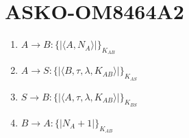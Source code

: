 \section{ASKO-OM8464A2}

\begin{enumerate}
    \item $A \rightarrow B : \{| \langle   A,N_A \rangle|\}_{K_{AB}}$
    \item $A \rightarrow S : \{|\langle B, \tau, \lambda, K_{AB} \rangle |\}_{K_{AS}}$
    \item $S \rightarrow B : \{|\langle A, \tau, \lambda, K_{AB} \rangle |\}_{K_{BS}}$
    \item $B \rightarrow A : \{|N_A+1|\}_{K{_{AB}}}$
\end{enumerate}